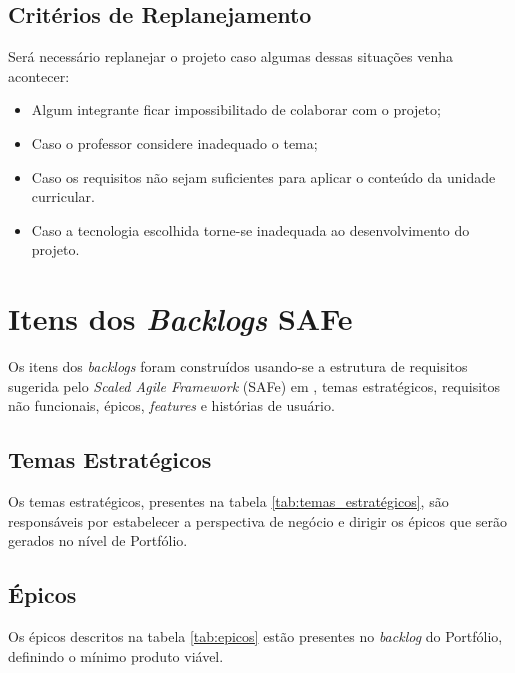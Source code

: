 \documentclass[
	12pt,				%
	oneside,			%
	a4paper,			%
	english,			%
	brazil,				%
	]{abntex2}
\begin{document}
\section{Critérios de Replanejamento}
Será necessário replanejar o projeto caso algumas dessas situações venha acontecer:
\begin{itemize}
    \item Algum integrante ficar impossibilitado de colaborar com o projeto;
    \item Caso o professor considere inadequado o tema;
    \item Caso os requisitos não sejam suficientes para aplicar o conteúdo da unidade curricular.
    \item Caso a tecnologia escolhida torne-se inadequada ao desenvolvimento do projeto.
\end{itemize}

\chapter{Itens dos \textit{Backlogs} SAFe}
Os itens dos \textit{backlogs} foram construídos usando-se a estrutura de requisitos sugerida pelo \foreignlanguage{english}{\textit{Scaled Agile Framework}} (SAFe) em \cite{safe_requirements_model}, temas estratégicos, requisitos não funcionais, épicos, \textit{features} e histórias de usuário.

\section{Temas Estratégicos}
Os temas estratégicos, presentes na tabela \ref{tab:temas_estratégicos}, são responsáveis por estabelecer a perspectiva de negócio e dirigir os épicos que serão gerados no nível de Portfólio.

\begin{table}[ht]
\end{table}

\section{Épicos}
Os épicos descritos na tabela \ref{tab:epicos} estão presentes no \foreignlanguage{english}{\textit{backlog}} do Portfólio, definindo o mínimo produto viável.
\end{document}
